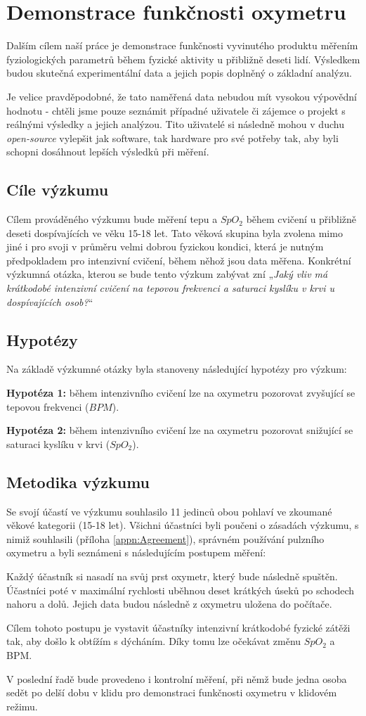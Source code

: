 \section{Demonstrace funkčnosti oxymetru}
Dalším cílem naší práce je demonstrace funkčnosti vyvinutého produktu měřením fyziologických parametrů během fyzické aktivity u přibližně deseti lidí. Výsledkem budou skutečná experimentální data a jejich popis doplněný o základní analýzu.
\par Je velice pravděpodobné, že tato naměřená data nebudou mít vysokou výpovědní hodnotu - chtěli jsme pouze seznámit případné uživatele či zájemce o projekt s reálnými výsledky a jejich analýzou. Tito uživatelé si následně mohou v duchu \emph{open-source} vylepšit jak software, tak hardware pro své potřeby tak, aby byli schopni dosáhnout lepších výsledků při měření.
\subsection{Cíle výzkumu}
Cílem prováděného výzkumu bude měření tepu a $SpO_2$ během cvičení u přibližně deseti dospívajících ve věku 15-18 let. Tato věková skupina byla zvolena mimo jiné i pro svoji v průměru velmi dobrou fyzickou kondici, která je nutným předpokladem pro intenzivní cvičení, během něhož jsou data měřena. Konkrétní výzkumná otázka, kterou se bude tento výzkum zabývat zní „\emph{Jaký vliv má krátkodobé intenzivní cvičení na tepovou frekvenci a saturaci kyslíku v krvi u dospívajících osob?}“
\subsection{Hypotézy}
Na základě výzkumné otázky byla stanoveny následující hypotézy pro výzkum:
\par\textbf{Hypotéza 1:} během intenzivního cvičení lze na oxymetru pozorovat zvyšující se tepovou frekvenci ($BPM$).
\par\textbf{Hypotéza 2:} během intenzivního cvičení lze na oxymetru pozorovat snižující se saturaci kyslíku v krvi ($SpO_2$).
\subsection{Metodika výzkumu}
Se svojí účastí ve výzkumu souhlasilo 11 jedinců obou pohlaví ve zkoumané věkové kategorii (15-18 let). Všichni účastníci byli poučeni o zásadách výzkumu, s nimiž souhlasili (příloha \ref{appn:Agreement}), správném používání pulzního oxymetru a byli seznámeni s následujícím postupem měření:
\par Každý účastník si nasadí na svůj prst oxymetr, který bude následně spuštěn. Účastníci poté v maximální rychlosti uběhnou deset krátkých úseků po schodech nahoru a dolů. Jejich data budou následně z oxymetru uložena do počítače.
\par Cílem tohoto postupu je vystavit účastníky intenzivní krátkodobé fyzické zátěži tak, aby došlo k obtížím s dýcháním. Díky tomu lze očekávat změnu $SpO_2$ a BPM.
\par V poslední řadě bude provedeno i kontrolní měření, při němž bude jedna osoba sedět po delší dobu v klidu pro demonstraci funkčnosti oxymetru v klidovém režimu.
